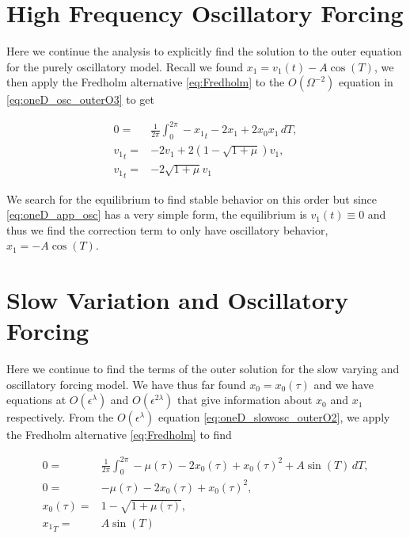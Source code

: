 \section*{High Frequency Oscillatory Forcing}

Here we continue the analysis to explicitly find the solution to the outer equation for the purely oscillatory model. Recall we found $x_1 = v_1(t)-A\cos(T)$, we then apply the Fredholm alternative \eqref{eq:Fredholm} to the $O(\Omega^{-2})$ equation in \eqref{eq:oneD_osc_outerO3} to get

\begin{equation}\label{eq:oneD_app_osc}
\begin{aligned}
0=&\frac{1}{2\pi}\int_0^{2\pi}-{x_1}_t-2x_1+2x_0x_1\, dT,\\
{v_1}_t=& -2v_1+2(1-\sqrt{1+\mu})v_1,\\
{v_1}_t=& -2\sqrt{1+\mu}v_1
\end{aligned}
\end{equation}

We search for the equilibrium to find stable behavior on this order but since \eqref{eq:oneD_app_osc} has a very simple form, the equilibrium is $v_1(t)\equiv 0$ and thus we find the correction term to only have oscillatory behavior, $x_1=-A\cos(T)$.

\section*{Slow Variation and Oscillatory Forcing}

Here we continue to find the terms of the outer solution for the slow varying and oscillatory forcing model. We have thus far found $x_0=x_0(\tau)$ and we have equations at $O(\epsilon^\lambda)$ and $O(\epsilon^{2\lambda})$ that give information about $x_0$ and $x_1$ respectively. From the $O(\epsilon^\lambda)$ equation \eqref{eq:oneD_slowosc_outerO2}, we apply the Fredholm alternative \eqref{eq:Fredholm} to find

\begin{equation}\label{eq:oneD_app_slowosc1}
\begin{aligned}
0 = & \frac{1}{2\pi}\int_0^{2\pi} -\mu(\tau) -2x_0(\tau)+x_0(\tau)^2+A\sin(T)\,dT,\\
0=&-\mu(\tau)-2x_0(\tau)+x_0(\tau)^2,\\
x_0(\tau) =& 1-\sqrt{1+\mu(\tau)},\\
{x_1}_T = & A\sin(T)
\end{aligned}
\end{equation}

